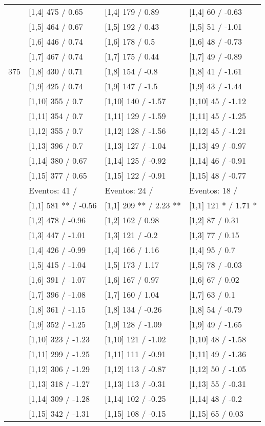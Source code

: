 \begin{table}
\begin{tabular}[t]{llll}
\addlinespace
 & {}[1,4] 475  / 0.65 & {}[1,4] 179  / 0.89 & {}[1,4] 60  / -0.63\\
 & {}[1,5] 464  / 0.67 & {}[1,5] 192  / 0.43 & {}[1,5] 51  / -1.01\\
 & {}[1,6] 446  / 0.74 & {}[1,6] 178  / 0.5 & {}[1,6] 48  / -0.73\\
 & {}[1,7] 467  / 0.74 & {}[1,7] 175  / 0.44 & {}[1,7] 49  / -0.89\\
375 & {}[1,8] 430  / 0.71 & {}[1,8] 154  / -0.8 & {}[1,8] 41  / -1.61\\
\addlinespace
 & {}[1,9] 425  / 0.74 & {}[1,9] 147  / -1.5 & {}[1,9] 43  / -1.44\\
 & {}[1,10] 355  / 0.7 & {}[1,10] 140  / -1.57 & {}[1,10] 45  / -1.12\\
 & {}[1,11] 354  / 0.7 & {}[1,11] 129  / -1.59 & {}[1,11] 45  / -1.25\\
 & {}[1,12] 355  / 0.7 & {}[1,12] 128  / -1.56 & {}[1,12] 45  / -1.21\\
 & {}[1,13] 396  / 0.7 & {}[1,13] 127  / -1.04 & {}[1,13] 49  / -0.97\\
\addlinespace
 & {}[1,14] 380  / 0.67 & {}[1,14] 125  / -0.92 & {}[1,14] 46  / -0.91\\
 & {}[1,15] 377  / 0.65 & {}[1,15] 122  / -0.91 & {}[1,15] 48  / -0.77\\
 & Eventos:  41 / & Eventos:  24 / & Eventos:  18 /\\
 & {}[1,1] 581 ** / -0.56 & {}[1,1] 209 ** / 2.23 ** & {}[1,1] 121 * / 1.71 *\\
 & {}[1,2] 478  / -0.96 & {}[1,2] 162  / 0.98 & {}[1,2] 87  / 0.31\\
\addlinespace
 & {}[1,3] 447  / -1.01 & {}[1,3] 121  / -0.2 & {}[1,3] 77  / 0.15\\
 & {}[1,4] 426  / -0.99 & {}[1,4] 166  / 1.16 & {}[1,4] 95  / 0.7\\
 & {}[1,5] 415  / -1.04 & {}[1,5] 173  / 1.17 & {}[1,5] 78  / -0.03\\
 & {}[1,6] 391  / -1.07 & {}[1,6] 167  / 0.97 & {}[1,6] 67  / 0.02\\
 & {}[1,7] 396  / -1.08 & {}[1,7] 160  / 1.04 & {}[1,7] 63  / 0.1\\
\addlinespace
500 & {}[1,8] 361  / -1.15 & {}[1,8] 134  / -0.26 & {}[1,8] 54  / -0.79\\
 & {}[1,9] 352  / -1.25 & {}[1,9] 128  / -1.09 & {}[1,9] 49  / -1.65\\
 & {}[1,10] 323  / -1.23 & {}[1,10] 121  / -1.02 & {}[1,10] 48  / -1.58\\
 & {}[1,11] 299  / -1.25 & {}[1,11] 111  / -0.91 & {}[1,11] 49  / -1.36\\
 & {}[1,12] 306  / -1.29 & {}[1,12] 113  / -0.87 & {}[1,12] 50  / -1.05\\
\addlinespace
 & {}[1,13] 318  / -1.27 & {}[1,13] 113  / -0.31 & {}[1,13] 55  / -0.31\\
 & {}[1,14] 309  / -1.28 & {}[1,14] 102  / -0.25 & {}[1,14] 48  / -0.2\\
 & {}[1,15] 342  / -1.31 & {}[1,15] 108  / -0.15 & {}[1,15] 65  / 0.03\\
\bottomrule
\end{tabular}
\end{table}
